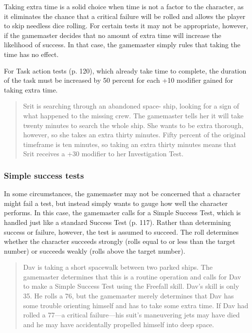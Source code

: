 Taking extra time is a solid choice when time is not a factor to the character, as it eliminates the chance that a critical failure will be rolled and allows the player to skip needless dice rolling. For certain tests it may not be appropriate, however, if the gamemaster decides that no amount of extra time will increase the likelihood of success. In that case, the gamemaster simply rules that taking the time has no effect.

For Task action tests (p. 120), which already take time to complete, the duration of the task must be increased by 50 percent for each +10 modifier gained for taking extra time.

\begin{quotation}
Srit is searching through an abandoned space- ship, looking for a sign of what happened to the missing crew. The gamemaster tells her it will take twenty minutes to search the whole ship. She wants to be extra thorough, however, so she takes an extra thirty minutes. Fifty percent of the original timeframe is ten minutes, so taking an extra thirty minutes means that Srit receives a +30 modifier to her Investigation Test.
\end{quotation}

\subsubsection{Simple success tests}
\label{sec:simple-success-tests}

In some circumstances, the gamemaster may not be concerned that a character might fail a test, but instead simply wants to gauge how well the character performs. In this case, the gamemaster calls for a Simple Success Test, which is handled just like a standard Success Test (p. 117). Rather than determining success or failure, however, the test is assumed to succeed. The roll determines whether the character succeeds strongly (rolls equal to or less than the target number) or succeeds weakly (rolls above the target number).

\begin{quotation}
Dav is taking a short spacewalk between two parked ships. The gamemaster determines that this is a routine operation and calls for Dav to make a Simple Success Test using the Freefall skill. Dav's skill is only 35. He rolls a 76, but the gamemaster merely determines that Dav has some trouble orienting himself and has to take some extra time. If Dav had rolled a 77—a critical failure—his suit's maneuvering jets may have died and he may have accidentally propelled himself into deep space.
\end{quotation}

